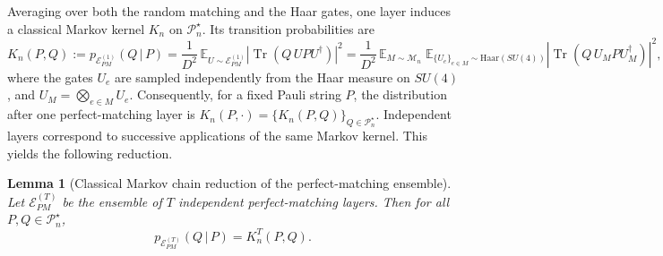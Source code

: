 \documentclass[
    aps,
    superscriptaddress,
    onecolumn,
    10pt,
    prx,
    nofootinbib
]{revtex4-2}
\newtheorem{lemma}{Lemma}
\theoremstyle{namedstatement}
\theoremstyle{plain}
\begin{document}
Averaging over both the random matching and the Haar gates, one layer induces a classical Markov kernel $K_n$ on $\mathcal{P}_n^\star$. Its transition probabilities are
\begin{equation}
\label{eq:markov_kernel}
    K_n(P,Q) := p_{\mathcal{E}_{PM}^{(1)}}(Q \,|\, P)= \frac{1}{D^{2}}\, \mathbb{E}_{U \sim \mathcal{E}_{PM}^{(1)}} \left| \operatorname{Tr}\!\left(Q\, U P U^{\dagger}\right) \right|^{2}
    =
    \frac{1}{D^{2}}\, 
    \mathbb{E}_{M \sim \mathcal{M}_n}\;
    \mathbb{E}_{\{U_e\}_{e\in M} \sim \mathrm{Haar}(SU(4))}
    \left| \operatorname{Tr}\!\left(Q\, U_M P U_M^{\dagger}\right) \right|^{2},
\end{equation}
where the gates $U_e$ are sampled independently from the Haar measure on $SU(4)$, and $U_M=\bigotimes_{e\in M} U_e$. Consequently, for a fixed Pauli string $P$, the distribution after one perfect-matching layer is $K_n(P,\cdot)=\{K_n(P,Q)\}_{Q\in\mathcal{P}_n^{\star}}$. Independent layers correspond to successive applications of the same Markov kernel. This yields the following reduction.
\begin{lemma}[Classical Markov chain reduction of the perfect-matching ensemble]\label{lem:pauli-chain-reduction}
Let $\mathcal{E}_{PM}^{(T)}$ be the ensemble of $T$ independent perfect-matching layers. Then for all $P,Q \in \mathcal{P}_n^\star$,
\begin{equation}
    p_{\mathcal{E}_{PM}^{(T)}}(Q \,|\, P) = K_n^{T}(P,Q).
\end{equation}
\end{lemma}
\end{document}
